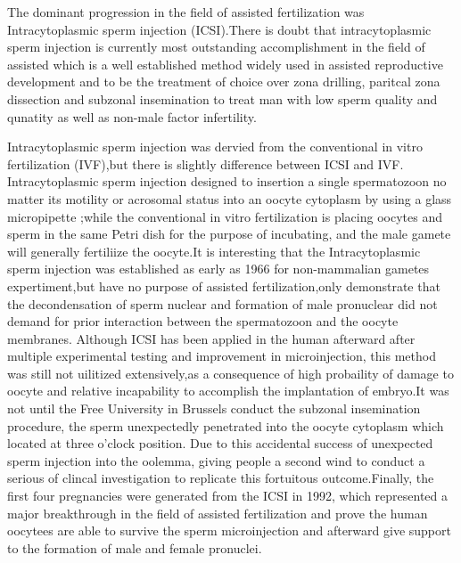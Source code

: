 \documentclass[12pt]{article}
\begin{document}
The dominant progression in the field of assisted fertilization was Intracytoplasmic sperm injection (ICSI).There is doubt that intracytoplasmic sperm injection is currently most outstanding  accomplishment in the field of assisted which is a well established method 
widely used  in assisted reproductive development  and  to be the treatment of choice over zona drilling, paritcal zona dissection and subzonal insemination to treat man with low sperm quality and qunatity as well as non-male factor infertility. \medskip

Intracytoplasmic sperm injection was dervied from the conventional in vitro fertilization (IVF),but there is slightly difference between ICSI and IVF. Intracytoplasmic sperm injection designed to insertion a single spermatozoon no matter its motility or acrosomal status into an oocyte cytoplasm by using a glass micropipette
;while the conventional in vitro fertilization is placing oocytes and sperm in the same Petri dish for the purpose of incubating, and the male gamete will generally fertiliize the oocyte.It is interesting that the Intracytoplasmic sperm injection was established as early as 1966 for non-mammalian gametes expertiment,but have no purpose of assisted fertilization,only demonstrate that the decondensation of sperm nuclear and formation of male pronuclear did not demand for prior interaction between the spermatozoon and the oocyte membranes.
Although ICSI has been applied in the human afterward after multiple experimental testing and improvement in microinjection, this method was still not uilitized extensively,as a consequence of high probaility of damage to oocyte and relative incapability to accomplish the implantation of embryo.It was not until the Free University in Brussels conduct the  subzonal insemination procedure, the sperm unexpectedly penetrated into the oocyte cytoplasm which located at three o'clock position. Due to this accidental success of unexpected sperm injection into the oolemma, giving people a second wind to conduct a serious of clincal investigation to replicate this fortuitous outcome.Finally, the first four pregnancies were generated from the ICSI in 1992, which represented a major breakthrough in the field of assisted fertilization and prove the human oocytees are able to survive the sperm microinjection and afterward give support to the formation of male and female pronuclei.
\end{document}
